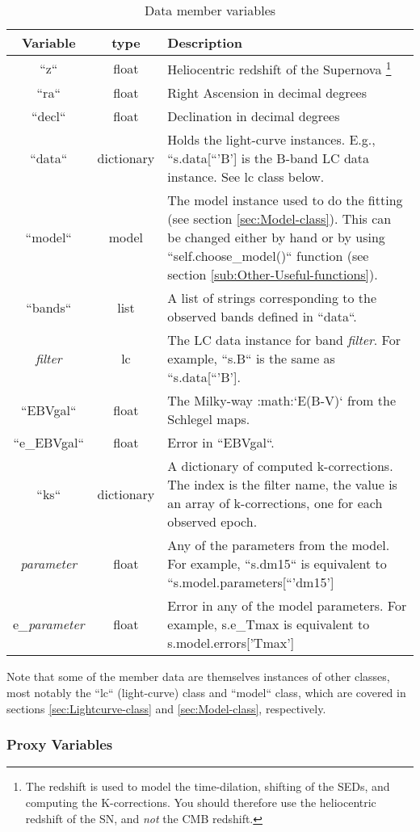 \begin{table}
\begin{tabular}{|c|c|>{\raggedright}p{}|}
\hline 
Variable & type & Description\tabularnewline
\hline 
\hline 
``z`` & float & Heliocentric redshift of the Supernova%
\footnote{The redshift is used to model the time-dilation, shifting of the SEDs,
and computing the K-corrections. You should therefore use the heliocentric
redshift of the SN, and \emph{not} the CMB redshift.%
}\tabularnewline
\hline 
``ra`` & float & Right Ascension in decimal degrees\tabularnewline
\hline 
``decl`` & float & Declination in decimal degrees\tabularnewline
\hline 
``data`` & dictionary & Holds the light-curve instances. E.g., ``s.data{[``'B'{]}} is
the B-band LC data instance. See lc class below. \tabularnewline
\hline 
``model`` & model & The model instance used to do the fitting (see section \ref{sec:Model-class}).
This can be changed either by hand or by using ``self.choose_model()``
function (see section \ref{sub:Other-Useful-functions}). \tabularnewline
\hline 
``bands`` & list & A list of strings corresponding to the observed bands defined in ``data``.\tabularnewline
\hline 
\emph{filter} & lc & The LC data instance for band \emph{filter}. For example, ``s.B``
is the same as ``s.data{[``'B'{]}}.\tabularnewline
\hline 
``EBVgal`` & float & The Milky-way :math:`E\left(B-V\right)` from the Schlegel maps.\tabularnewline
\hline 
``e_EBVgal`` & float & Error in ``EBVgal``.\tabularnewline
\hline 
``ks`` & dictionary & A dictionary of computed k-corrections. The index is the filter name,
the value is an array of k-corrections, one for each observed epoch.\tabularnewline
\hline 
\emph{parameter} & float & Any of the parameters from the model. For example, ``s.dm15``
is equivalent to ``s.model.parameters{[``'dm15'{]}}\tabularnewline
\hline 
e\emph{_parameter} & float & Error in any of the model parameters. For example, s.e_Tmax is equivalent
to s.model.errors{[}'Tmax'{]}\tabularnewline
\hline 
\end{tabular}

\caption{Data member variables\label{tab:sn-member-variables}}
\end{table}


Note that some of the member data are themselves instances of other
classes, most notably the ``lc`` (light-curve) class and ``model``
class, which are covered in sections \ref{sec:Lightcurve-class} and
\ref{sec:Model-class}, respectively.


\subsubsection{Proxy Variables}

